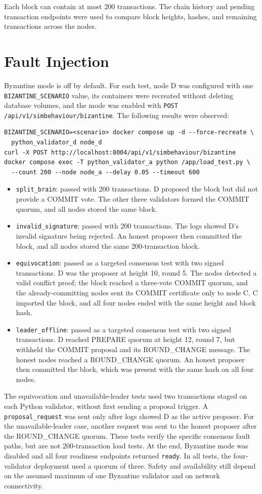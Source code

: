 \documentclass[11pt, a4paper, oneside]{memoir}
\begin{document}
Each block can contain at most 200 transactions. The chain history and pending
transaction endpoints were used to compare block heights, hashes, and
remaining transactions across the nodes.

\section{Fault Injection}
Byzantine mode is off by default. For each test, node D was configured with
one \texttt{BIZANTINE\_SCENARIO} value, its containers were recreated without
deleting database volumes, and the mode was enabled with
\texttt{POST /api/v1/simbehaviour/bizantine}. The following results were
observed:
\begin{verbatim}
BIZANTINE_SCENARIO=<scenario> docker compose up -d --force-recreate \
  python_validator_d node_d
curl -X POST http://localhost:8004/api/v1/simbehaviour/bizantine
docker compose exec -T python_validator_a python /app/load_test.py \
  --count 200 --node node_a --delay 0.05 --timeout 600
\end{verbatim}
\begin{itemize}
    \item \texttt{split\_brain}: passed with 200 transactions. D proposed the
    block but did not provide a COMMIT vote. The other three validators formed
    the COMMIT quorum, and all nodes stored the same block.
    \item \texttt{invalid\_signature}: passed with 200 transactions. The logs
    showed D's invalid signature being rejected. An honest proposer then
    committed the block, and all nodes stored the same 200-transaction block.
    \item \texttt{equivocation}: passed as a targeted consensus test with two
    signed transactions. D was the proposer at height 10, round 5. The nodes
    detected a valid conflict proof; the block reached a three-vote COMMIT
    quorum, and the already-committing nodes sent its COMMIT certificate only
    to node C. C imported the block, and all four nodes ended with the
    same height and block hash.
    \item \texttt{leader\_offline}: passed as a targeted consensus test with
    two signed transactions. 
    D reached PREPARE quorum at height 12, round 7,
    but withheld the COMMIT proposal and its ROUND\_CHANGE message. The honest
    nodes reached a ROUND\_CHANGE quorum. An honest proposer then committed
    the block, which was present with the same hash on all four nodes.
\end{itemize}
The equivocation and unavailable-leader tests used two transactions staged on
each Python validator, without first sending a proposal trigger. A
\texttt{proposal\_request} was sent only after logs showed D as the active
proposer. For the unavailable-leader case, another request was sent to the
honest proposer after the ROUND\_CHANGE quorum. These tests verify the specific
consensus fault paths, but are not 200-transaction load tests. At the end,
Byzantine mode was disabled and all four readiness endpoints returned
\texttt{ready}. In all tests, the four-validator deployment used a quorum of
three. Safety and availability still depend on the assumed maximum of one
Byzantine validator and on network connectivity.
\end{document}

